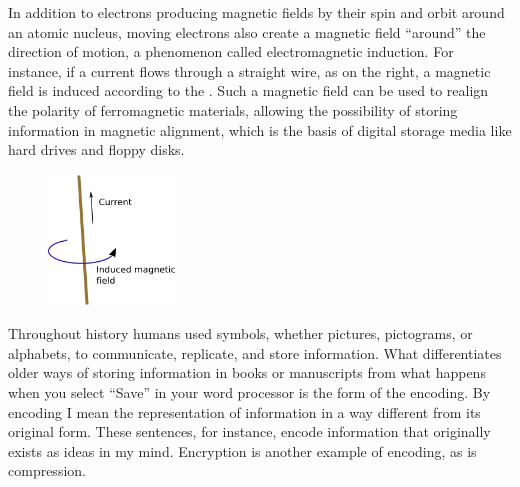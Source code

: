  \vspace{0.2cm}

In addition to electrons producing magnetic fields by their spin and orbit around an atomic nucleus, moving electrons also create a magnetic field ``around'' the direction of motion, a phenomenon called electromagnetic induction. For instance, if a current flows through a straight wire, as on the right, a magnetic field is induced according to the . Such a magnetic field can be used to realign the polarity of ferromagnetic materials, allowing the possibility of storing information in magnetic alignment, which is the basis of digital storage media like hard drives and floppy disks. \\

	\begin{figure}[H]
	   \centering
	   \includegraphics[width=0.3\textwidth]{season1/111/images/111(1).png} 
	\end{figure}


Throughout history humans used symbols, whether pictures, pictograms, or alphabets, to communicate, replicate, and store information. What differentiates older ways of storing information in books or manuscripts from what happens when you select ``Save'' in your word processor is the form of the encoding. By encoding I mean the representation of information in a way different from its original form. These sentences, for instance, encode information that originally exists as ideas in my mind. Encryption is another example of encoding, as is compression. \\

